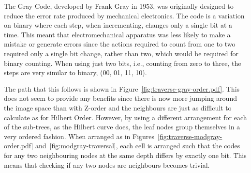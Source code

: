 The Gray Code, developed by Frank Gray in 1953\cite{gray1953pulse}, was
originally designed to reduce the error rate produced by mechanical
electronics. The code is a variation on binary where each step, when
incrementing, changes only a single bit at a time. This meant that
electromechanical apparatus was less likely to make a mistake or generate
errors since the actions required to count from one to two required only a
single bit change, rather than two, which would be required for binary
counting.  When using just two bits, i.e., counting from zero to three, the
steps are very similar to binary, (00, 01, 11, 10).

The path that this follows is shown in
Figure~\ref{fig:traverse-gray-order.pdf}. This does not seem to provide any
benefits since there is now more jumping around the image space than with
Z-order and the neighbours are just as difficult to calculate as for Hilbert
Order. However, by using a different arrangement for each of the sub-trees, as
the Hilbert curve does, the leaf nodes group themselves in a very ordered
fashion.  When arranged as in Figures~\ref{fig:traverse-modgray-order.pdf}
and~\ref{fig:modgray-traversal}, each cell is arranged such that the codes for
any two neighbouring nodes at the same depth differs by exactly one bit. This
means that checking if any two nodes are neighbours becomes trivial.

